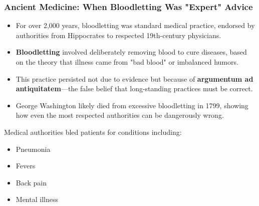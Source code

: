 \documentclass{beamer}
\begin{document}
	\begin{frame}
		\frametitle{Ancient Medicine: When Bloodletting Was "Expert" Advice}
		\begin{itemize}
			\small
			\item For over 2,000 years, bloodletting was standard medical practice, endorsed by authorities from Hippocrates to respected 19th-century physicians.
			\item \textbf{Bloodletting} involved deliberately removing blood to cure diseases, based on the theory that illness came from "bad blood" or imbalanced humors.
			\item This practice persisted not due to evidence but because of \textbf{argumentum ad antiquitatem}—the false belief that long-standing practices must be correct.
			\item George Washington likely died from excessive bloodletting in 1799, showing how even the most respected authorities can be dangerously wrong.
		\end{itemize}
		
		\begin{example}
			\scriptsize
			Medical authorities bled patients for conditions including:
			\begin{itemize}
				\item Pneumonia
				\item Fevers
				\item Back pain
				\item Mental illness
			\end{itemize}
		\end{example}
	\end{frame}
	
\end{document}
